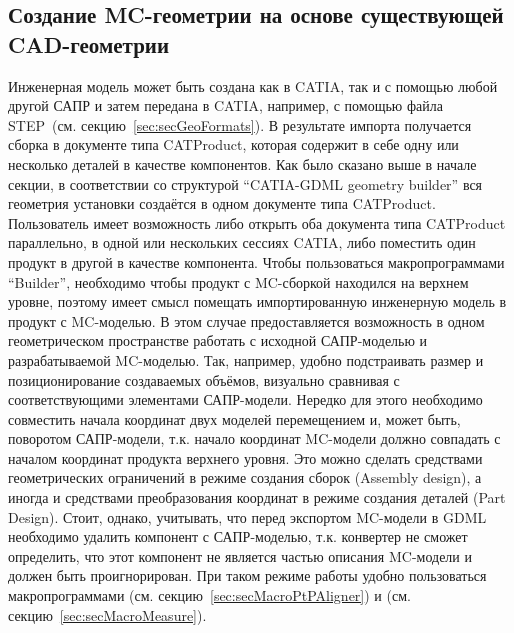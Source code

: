 \subsection[Создание MC-геометрии на основе существующей CAD-геометрии]{Создание MC-геометрии на основе существующей\\ CAD-геометрии}\label{sec:secMCfromCAD}

Инженерная модель может быть создана как в CATIA, так и с помощью любой другой САПР и затем передана в CATIA, например, с помощью файла STEP~(см. секцию~\ref{sec:secGeoFormats}).
В результате импорта получается сборка в документе типа CATProduct, которая содержит в себе одну или несколько деталей в качестве компонентов.
Как было сказано выше в начале секции, в соответствии со структурой ``CATIA-GDML geometry builder'' вся геометрия установки создаётся в одном документе типа CATProduct. 
Пользователь имеет возможность либо открыть оба документа типа CATProduct параллельно, в одной или нескольких сессиях CATIA, либо поместить один продукт в другой в качестве компонента. Чтобы пользоваться макропрограммами ``Builder'', необходимо чтобы продукт с MC-сборкой находился на верхнем уровне, поэтому имеет смысл помещать импортированную инженерную модель в продукт с MC-моделью. В этом случае предоставляется возможность в одном геометрическом пространстве работать с исходной САПР-моделью и разрабатываемой MC-моделью. Так, например, удобно подстраивать размер и позиционирование создаваемых объёмов, визуально сравнивая с соответствующими элементами САПР-модели. Нередко для этого необходимо совместить начала координат двух моделей перемещением и, может быть, поворотом САПР-модели, т.к. начало координат MC-модели должно совпадать с началом координат продукта верхнего уровня. Это можно сделать средствами геометрических ограничений в режиме создания сборок (Assembly design), а иногда и средствами преобразования координат в режиме создания деталей (Part Design). Стоит, однако, учитывать, что перед экспортом MC-модели в GDML необходимо удалить компонент с САПР-моделью, т.к. конвертер  не сможет определить, что этот компонент не является частью описания MC-модели и должен быть проигнорирован.
При таком режиме работы удобно пользоваться макропрограммами  (см. секцию~\ref{sec:secMacroPtPAligner}) и  (см. секцию~\ref{sec:secMacroMeasure}).

